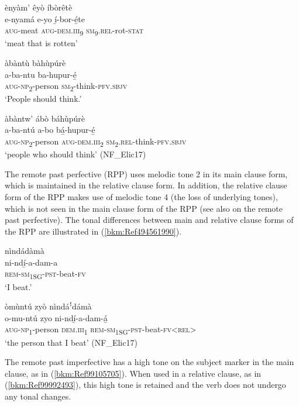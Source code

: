 \ex
ènyàm’ êyò íbòrêtè\\
\gll e-nyamá  e-yo    í̲-bor-é̲te\\
\textsc{aug}-meat  \textsc{aug}-\textsc{dem}.\textsc{iii}\textsubscript{9}  \textsc{sm}\textsubscript{9}.\textsc{rel}-rot-\textsc{stat}\\
\glt ‘meat that is rotten’
\z\z

\newpage
\ea
\label{bkm:Ref71272288}
\ea
àbàntù bàhùpúrè\\
\gll a-ba-ntu    ba-hupur-é̲\\
\textsc{aug}-\textsc{np}\textsubscript{2}-person  \textsc{sm}\textsubscript{2}-think-\textsc{pfv}.\textsc{sbjv}\\
\glt ‘People should think.’

\ex
àbàntw’ ábò báhùpúrè\\
\gll a-ba-ntú    a-bo    bá̲-hupur-é̲\\
\textsc{aug}-\textsc{np}\textsubscript{2}-person  \textsc{aug}-\textsc{dem}.\textsc{iii}\textsubscript{2}  \textsc{sm}\textsubscript{2}.\textsc{rel}-think-\textsc{pfv}.\textsc{sbjv}\\
\glt ‘people who should think’ (NF\_Elic17)
\z\z

The remote past perfective (RPP) uses melodic tone 2 in its main clause form, which is maintained in the relative clause form. In addition, the relative clause form of the RPP makes use of melodic tone 4 (the loss of underlying tones), which is not seen in the main clause form of the RPP (see also  on the remote past perfective). The tonal differences between main and relative clause forms of the RPP are illustrated in (\ref{bkm:Ref494561990}).

\ea
\label{bkm:Ref494561990}
\ea
\glll nìndádàmà\\
ni-ndí̲-a-dam-a\\
\textsc{rem}-\textsc{sm}\textsubscript{1SG}-\textsc{pst}-beat-\textsc{fv}\\
\glt ‘I beat.’

\ex
òmùntú zyò nìndáꜝdámà\\
\gll o-mu-ntú    zyo    ni-ndí̲-a-dam-á̲\\
\textsc{aug}-\textsc{np}\textsubscript{1}-person  \textsc{dem}.\textsc{iii}\textsubscript{1}  \textsc{rem}-\textsc{sm}\textsubscript{1SG}-\textsc{pst}-beat-\textsc{fv}<\textsc{rel}>\\
\glt ‘the person that I beat’ (NF\_Elic17)
\z\z

The remote past imperfective has a high tone on the subject marker in the main clause, as in (\ref{bkm:Ref99105705}). When used in a relative clause, as in (\ref{bkm:Ref99992493}), this high tone is retained and the verb does not undergo any tonal changes.

